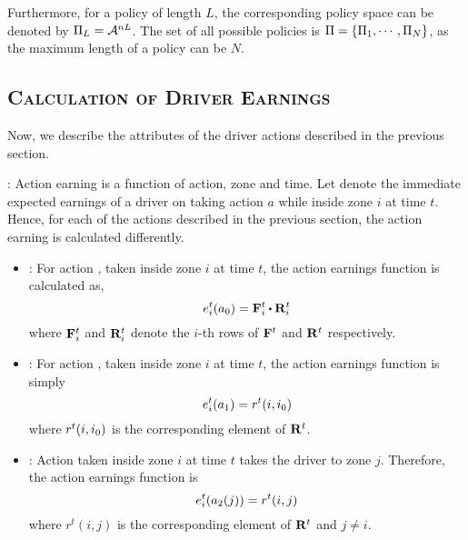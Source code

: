 Furthermore, for a policy of length $L$, the corresponding policy space can be denoted by
$\Pi_L = \mathcal{A}^{nL}$. The set of all possible policies is $\Pi = \{\Pi_1, \cdots, \Pi_N\}$, as the maximum length of a policy can be $N$.


\subsection{\textsc{Calculation of Driver Earnings}}
Now, we describe the attributes of the driver actions described in the previous section.

:
Action earning is a function of action, zone and time. Let {} denote the immediate expected earnings of a driver 
on taking action $a$ while inside zone $i$ at time $t$. Hence, for each of the actions described in the previous section, the
action earning is calculated differently.

\begin{itemize}
	\item {\getpassenger} : For action {\getpassengeraction}, taken inside zone $i$ at time $t$, the action earnings function
	is calculated as,
	\begin{equation}
	\actionearning{i}{t}{a_0} = \empiricaltransitionmatrix_{i}^{t} \bigcdot \rewardsmatrix_{i}^{t}
	\end{equation}
	where ${\mathbf{F}}_{i}^{t}$ and ${\mathbf{R}}_{i}^{t}$ denote the $i$-th rows of ${\mathbf{F}}^{t}$ and ${\mathbf{R}}^{t}$ respectively. \\

	\item {\gohome} : For action {\gohomeaction}, taken inside zone $i$ at time $t$, the action earnings function is simply
	\begin{equation}
	e_{i}^{t}({a_1}) = r^t(i,{i_0})
	\end{equation}
	where $r^t(i,{i_0})$ is the corresponding element of ${\mathbf{R}}^{t}$. \\

	\item {\relocate} : Action {\relocateaction} taken inside zone $i$ at time $t$ takes the driver to zone $j$. Therefore, the action earnings function is
	\begin{equation}
	e_{i}^{t}({a_2(j)}) = r^t(i,j)
	\end{equation}
	where $r^t(i,j)$ is the corresponding element of ${\mathbf{R}}^{t}$ and $j \neq i$. \\
\end{itemize}


